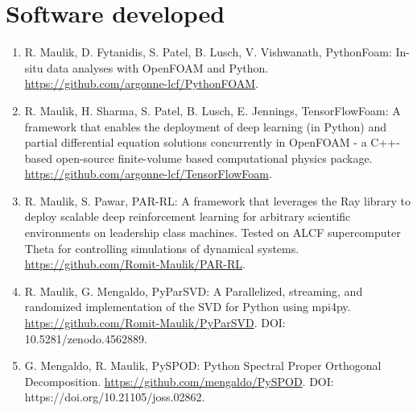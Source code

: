 \documentclass[letterpaper]{article}
\begin{document}
\section*{Software developed}

\begin{enumerate}

\item R. Maulik, D. Fytanidis, S. Patel, B. Lusch, V. Vishwanath, PythonFoam: In-situ data analyses with OpenFOAM and Python. \url{https://github.com/argonne-lcf/PythonFOAM}.

\item R. Maulik, H. Sharma, S. Patel, B. Lusch, E. Jennings, TensorFlowFoam: A framework that enables the deployment of deep learning (in Python) and partial differential equation solutions concurrently in OpenFOAM - a C++-based open-source finite-volume based computational physics package. \url{https://github.com/argonne-lcf/TensorFlowFoam}.

\item R. Maulik, S. Pawar, PAR-RL: A framework that leverages the Ray library to deploy scalable deep reinforcement learning for arbitrary scientific environments on leadership class machines. Tested on ALCF supercomputer Theta for controlling simulations of dynamical systems. \url{https://github.com/Romit-Maulik/PAR-RL}.

\item R. Maulik, G. Mengaldo, PyParSVD: A Parallelized, streaming, and randomized implementation of the SVD for Python using mpi4py. \url{https://github.com/Romit-Maulik/PyParSVD}. DOI: 10.5281/zenodo.4562889.

\item G. Mengaldo, R. Maulik, PySPOD: Python Spectral Proper Orthogonal Decomposition. \url{https://github.com/mengaldo/PySPOD}.  DOI: https://doi.org/10.21105/joss.02862.

\end{enumerate}

\end{document}

